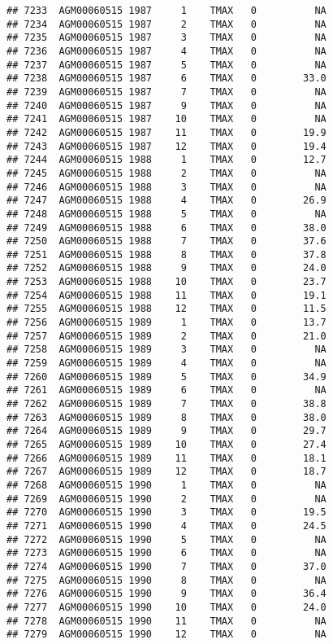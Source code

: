 \documentclass{article}\usepackage[]{graphicx}\usepackage[]{color}
\makeatletter
\newenvironment{kframe}{%
 \def\at@end@of@kframe{}%
 \ifinner\ifhmode%
  \def\at@end@of@kframe{\end{minipage}}%
  \begin{minipage}{\columnwidth}%
 \fi\fi%
 \def\FrameCommand##1{\hskip\@totalleftmargin \hskip-\fboxsep
 \colorbox{shadecolor}{##1}\hskip-\fboxsep
     \hskip-\linewidth \hskip-\@totalleftmargin \hskip\columnwidth}%
 \MakeFramed {\advance\hsize-\width
   \@totalleftmargin\z@ \linewidth\hsize
   \@setminipage}}%
 {\par\unskip\endMakeFramed%
 \at@end@of@kframe}
\newenvironment{knitrout}{}{} %
\makeatother
\begin{document}
\begin{knitrout}
\begin{kframe}
\begin{verbatim}
## 7233  AGM00060515 1987     1    TMAX   0          NA
## 7234  AGM00060515 1987     2    TMAX   0          NA
## 7235  AGM00060515 1987     3    TMAX   0          NA
## 7236  AGM00060515 1987     4    TMAX   0          NA
## 7237  AGM00060515 1987     5    TMAX   0          NA
## 7238  AGM00060515 1987     6    TMAX   0        33.0
## 7239  AGM00060515 1987     7    TMAX   0          NA
## 7240  AGM00060515 1987     9    TMAX   0          NA
## 7241  AGM00060515 1987    10    TMAX   0          NA
## 7242  AGM00060515 1987    11    TMAX   0        19.9
## 7243  AGM00060515 1987    12    TMAX   0        19.4
## 7244  AGM00060515 1988     1    TMAX   0        12.7
## 7245  AGM00060515 1988     2    TMAX   0          NA
## 7246  AGM00060515 1988     3    TMAX   0          NA
## 7247  AGM00060515 1988     4    TMAX   0        26.9
## 7248  AGM00060515 1988     5    TMAX   0          NA
## 7249  AGM00060515 1988     6    TMAX   0        38.0
## 7250  AGM00060515 1988     7    TMAX   0        37.6
## 7251  AGM00060515 1988     8    TMAX   0        37.8
## 7252  AGM00060515 1988     9    TMAX   0        24.0
## 7253  AGM00060515 1988    10    TMAX   0        23.7
## 7254  AGM00060515 1988    11    TMAX   0        19.1
## 7255  AGM00060515 1988    12    TMAX   0        11.5
## 7256  AGM00060515 1989     1    TMAX   0        13.7
## 7257  AGM00060515 1989     2    TMAX   0        21.0
## 7258  AGM00060515 1989     3    TMAX   0          NA
## 7259  AGM00060515 1989     4    TMAX   0          NA
## 7260  AGM00060515 1989     5    TMAX   0        34.9
## 7261  AGM00060515 1989     6    TMAX   0          NA
## 7262  AGM00060515 1989     7    TMAX   0        38.8
## 7263  AGM00060515 1989     8    TMAX   0        38.0
## 7264  AGM00060515 1989     9    TMAX   0        29.7
## 7265  AGM00060515 1989    10    TMAX   0        27.4
## 7266  AGM00060515 1989    11    TMAX   0        18.1
## 7267  AGM00060515 1989    12    TMAX   0        18.7
## 7268  AGM00060515 1990     1    TMAX   0          NA
## 7269  AGM00060515 1990     2    TMAX   0          NA
## 7270  AGM00060515 1990     3    TMAX   0        19.5
## 7271  AGM00060515 1990     4    TMAX   0        24.5
## 7272  AGM00060515 1990     5    TMAX   0          NA
## 7273  AGM00060515 1990     6    TMAX   0          NA
## 7274  AGM00060515 1990     7    TMAX   0        37.0
## 7275  AGM00060515 1990     8    TMAX   0          NA
## 7276  AGM00060515 1990     9    TMAX   0        36.4
## 7277  AGM00060515 1990    10    TMAX   0        24.0
## 7278  AGM00060515 1990    11    TMAX   0          NA
## 7279  AGM00060515 1990    12    TMAX   0          NA

\end{verbatim}
\end{kframe}
\end{knitrout}
\end{document}
